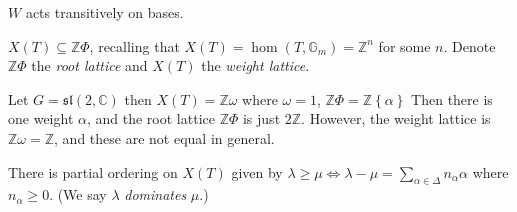 \begin{remark}

\begin{remark}

\(W\) acts transitively on bases.

\end{remark}

\end{remark}

\begin{remark}

\begin{remark}

\(X(T) \subseteq {\mathbb{Z}}\Phi\), recalling that
\(X(T) = \hom(T, {\mathbb{G}}_m) = {\mathbb{Z}}^n\) for some \(n\).
Denote \({\mathbb{Z}}\Phi\) the \emph{root lattice} and \(X(T)\) the
\emph{weight lattice}.

\end{remark}

\end{remark}

\begin{example}

\begin{example}

Let \(G = {\mathfrak{sl}}(2, {\mathbb{C}})\) then
\(X(T) = {\mathbb{Z}}\omega\) where \(\omega = 1\),
\({\mathbb{Z}}\Phi = {\mathbb{Z}}\left\{{\alpha}\right\}\) Then there is
one weight \(\alpha\), and the root lattice \({\mathbb{Z}}\Phi\) is just
\(2{\mathbb{Z}}\). However, the weight lattice is
\({\mathbb{Z}}\omega = {\mathbb{Z}}\), and these are not equal in
general.

\end{example}

\end{example}

\begin{remark}

\begin{remark}

There is partial ordering on \(X(T)\) given by
\(\lambda \geq \mu \iff \lambda - \mu = \sum_{\alpha\in \Delta} n_\alpha \alpha\)
where \(n_\alpha \geq 0\). (We say \(\lambda\) \emph{dominates}
\(\mu\).)

\end{remark}

\end{remark}

